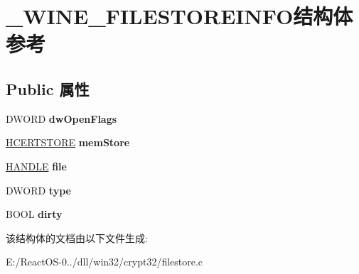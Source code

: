 \hypertarget{struct___w_i_n_e___f_i_l_e_s_t_o_r_e_i_n_f_o}{}\section{\+\_\+\+W\+I\+N\+E\+\_\+\+F\+I\+L\+E\+S\+T\+O\+R\+E\+I\+N\+F\+O结构体 参考}
\label{struct___w_i_n_e___f_i_l_e_s_t_o_r_e_i_n_f_o}
\subsection*{Public 属性}
\begin{DoxyCompactItemize}
\item 
\mbox{\label{struct___w_i_n_e___f_i_l_e_s_t_o_r_e_i_n_f_o_a85909e8dcda172c0465ac61c3de87e95}} 
D\+W\+O\+RD {\bfseries dw\+Open\+Flags}
\item 
\mbox{\label{struct___w_i_n_e___f_i_l_e_s_t_o_r_e_i_n_f_o_a6066c55388cc86cd0d6bfcdefcf5abbb}} 
\hyperlink{interfacevoid}{H\+C\+E\+R\+T\+S\+T\+O\+RE} {\bfseries mem\+Store}
\item 
\mbox{\label{struct___w_i_n_e___f_i_l_e_s_t_o_r_e_i_n_f_o_a6bed779f85d277a3052c98e180750a45}} 
\hyperlink{interfacevoid}{H\+A\+N\+D\+LE} {\bfseries file}
\item 
\mbox{\label{struct___w_i_n_e___f_i_l_e_s_t_o_r_e_i_n_f_o_adb4698df5aedb966bb989701bc69b9e0}} 
D\+W\+O\+RD {\bfseries type}
\item 
\mbox{\label{struct___w_i_n_e___f_i_l_e_s_t_o_r_e_i_n_f_o_a345b09cccf15e26ca6ef83a7e7397fda}} 
B\+O\+OL {\bfseries dirty}
\end{DoxyCompactItemize}


该结构体的文档由以下文件生成\+:\begin{DoxyCompactItemize}
\item 
E\+:/\+React\+O\+S-\/0../dll/win32/crypt32/filestore.\+c\end{DoxyCompactItemize}
